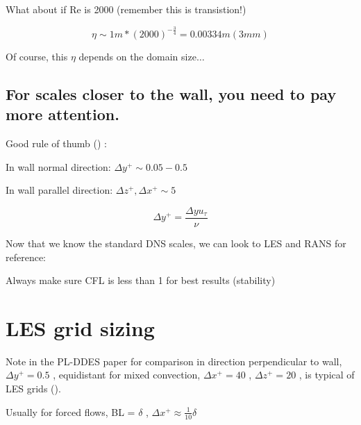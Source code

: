 \documentclass[12pt]{article}
\renewcommand{\_}{\kern-1.5pt\textunderscore\kern-1.5pt}
\begin{document}
\begin{itemize}
What about if Re is 2000 (remember this is transistion!)\par

 \[  \eta  \sim 1m\ast \left( 2000 \right) ^{-\frac{3}{4}}=0.00334m  \left( 3mm \right)  \] \par

Of course, this  \(  \eta   \)  depends on the domain size$ \ldots $ \par


\vspace{\baselineskip}

\subsection{For scales closer to the wall, you need to pay more attention.}
Good rule of thumb (\cite{Komen2014}) :\par 

In wall normal direction:  \(  \Delta y^{+} \sim 0.05-0.5 \) \par

In wall parallel direction:  \(  \Delta z^{+}, \Delta x^{+} \sim 5 \) \par

 \[  \Delta y^{+}=\frac{ \Delta yu_{ \tau}}{ \nu } \] \par

Now that we know the standard DNS scales, we can look to LES and RANS for reference:\par


\vspace{\baselineskip}
Always make sure CFL is less than 1 for best results (stability)\par


\vspace{\baselineskip}
\section{LES grid sizing}\par

Note in the PL-DDES paper for comparison in direction perpendicular to wall,  \(  \Delta y^{+}=0.5 \) , equidistant for mixed convection,  \(  \Delta x^{+}=40 \) ,  \(  \Delta z^{+}=20 \) , is typical of LES grids (\cite{Ding2020}).\par

Usually for forced flows, BL =  \(  \delta  \)  ,  \(  \Delta x^{+} \approx \frac{1}{10} \delta  \) \par


\end{itemize}
\end{document}
